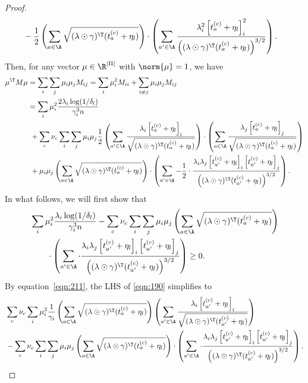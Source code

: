 \documentclass{article}
\newcommand{\1}{\mathbf{1}}
\begin{document}
\begin{proof}
\begin{align*}
&-\frac{1}{2}\left(\sum_{a \in \A} \sqrt{(\lambda\odot\gamma)^\T (t_a^{(c)}+\eta_l)}\right) \cdot\left(\sum_{a^{\prime} \in \A} \frac{\lambda_{i}^2 \left[t_{a}^{(c)}+\eta_l\right]_{i}^2}{\left((\lambda\odot\gamma)^\T (t_a^{(c)}+\eta_l)\right)^{3 / 2}}\right).
\end{align*}
Then, for any vector $\mu\in\R^{|\Pi|}$ with $\norm{\mu}=1$, we have 
\begin{align}
    \mu^\T M\mu &= \sum_{i}\sum_{j}\mu_i\mu_jM_{ij}=\sum_{i}\mu_i^2M_{ii}+\sum_{i\ne j}\mu_i\mu_jM_{ij}\nonumber\\
    &= \sum_{i}\mu_i^2\frac{2\lambda_i\log(1/\delta_l)}{\gamma_i^3 n}\\
    &\ +\sum_{c}\nu_c\sum_{i}\sum_{j}\mu_i\mu_j\frac{1}{2}\left(\sum_{a^{\prime} \in \A} \frac{\lambda_{i}\left[t_{a}^{(c)}+\eta_l\right]_{i}}{\sqrt{(\lambda\odot\gamma)^\T (t_a^{(c)}+\eta_l)}}\right) \cdot\left(\sum_{a \in \A} \frac{\lambda_{j}\left[t_{a}^{(c)}+\eta_l\right]_{j}}{\sqrt{(\lambda\odot\gamma)^\T (t_a^{(c)}+\eta_l)}}\right) \nonumber\\
    &\ +\mu_i\mu_j\left(\sum_{a \in \A} \sqrt{(\lambda\odot\gamma)^\T (t_a^{(c)}+\eta_l)}\right) \cdot\left(\sum_{a^{\prime} \in \A}-\frac{1}{2} \cdot \frac{\lambda_{i} \lambda_{j}\left[t_{a'}^{(c)}+\eta_l\right]_{i}\left[t_{a'}^{(c)}+\eta_l\right]_{j}}{\left((\lambda\odot\gamma)^\T (t_{a'}^{(c)}+\eta_l)\right)^{3 / 2}}\right).\label{eqn:190}
\end{align}
In what follows, we will first show that
\begin{align}
    &\sum_{i}\mu_i^2\frac{\lambda_i\log(1/\delta_l)}{\gamma_i^3 n}-\sum_c\nu_c\sum_{i}\sum_{j}\mu_i\mu_j\left(\sum_{a \in \A} \sqrt{(\lambda\odot\gamma)^\T (t_a^{(c)}+\eta_l)}\right)\nonumber\\
    &\qquad\cdot\left(\sum_{a^{\prime} \in \A}\cdot \frac{\lambda_{i} \lambda_{j}\left[t_{a'}^{(c)}+\eta_l\right]_{i}\left[t_{a'}^{(c)}+\eta_l\right]_{j}}{\left((\lambda\odot\gamma)^\T (t_{a'}^{(c)}+\eta_l)\right)^{3 / 2}}\right)\geq 0.\label{eqn:200}
\end{align}
By equation~\ref{eqn:211}, the LHS of \eqref{eqn:190} simplifies to 
\begin{align*}
    &\sum_{c}\nu_c\sum_{i}\mu_i^2\frac{1}{\gamma_i}\left(\sum_{a \in \A} \sqrt{(\lambda\odot\gamma)^\T (t_a^{(c)}+\eta_l)}\right)\left(\sum_{a^{\prime} \in \A}\frac{\lambda_{i} \left[t_{a'}^{(c)}+\eta_l\right]_{i}}{\sqrt{(\lambda\odot\gamma)^\T (t_{a'}^{(c)}+\eta_l)}}\right)\\
    &-\sum_{c}\nu_c\sum_{i}\sum_{j}\mu_i\mu_j\left(\sum_{a \in \A} \sqrt{(\lambda\odot\gamma)^\T (t_a^{(c)}+\eta_l)}\right) \cdot\left(\sum_{a^{\prime} \in \A}\cdot \frac{\lambda_{i} \lambda_{j}\left[t_{a'}^{(c)}+\eta_l\right]_{i}\left[t_{a'}^{(c)}+\eta_l\right]_{j}}{\left((\lambda\odot\gamma)^\T (t_{a'}^{(c)}+\eta_l)\right)^{3 / 2}}\right).

\end{align*}
\end{proof}
\end{document}
